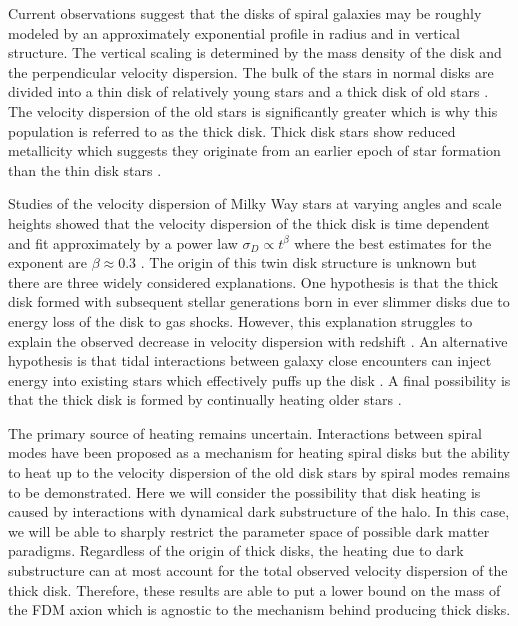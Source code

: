 \documentclass[usenatbib]{mnras}
\begin{document}
\hspace{5mm} Current observations suggest that the disks of spiral galaxies may be roughly modeled by an approximately exponential profile in radius and in vertical structure. The vertical scaling is determined by the mass density of the disk and the perpendicular velocity dispersion.  The bulk of the stars in normal disks are divided into a thin disk of relatively young stars and a thick disk of old stars \citep{binney_tremaine_2008}.  The velocity dispersion of the old stars is significantly greater which is why this population is referred to as the thick disk. Thick disk stars show reduced metallicity which suggests they originate from an earlier epoch of star formation than the thin disk stars \citep{binney_tremaine_2008}. 
\par
Studies of the velocity dispersion of Milky Way stars at varying angles and scale heights showed that the velocity dispersion of the thick disk is time dependent and fit approximately by a power law $\sigma_D \propto t^{\beta}$ where the best estimates for the exponent are $\beta \approx 0.3$ \citep{heating_history}. The origin of this twin disk structure is unknown but there are three widely considered explanations. One hypothesis is that the thick disk formed with subsequent stellar generations born in ever slimmer disks due to energy loss of the disk to gas shocks. However, this explanation struggles to explain the observed decrease in velocity dispersion with redshift \citep{emergence-thick-disk}. An alternative hypothesis is that tidal interactions between galaxy close encounters can inject energy into existing stars which effectively puffs up the disk \citep{thick-disk-mergers}. A final possibility is that the thick disk is formed by continually heating older stars \citep{thin-and-thick-disk}. 
\par 
The primary source of heating remains uncertain. Interactions between spiral modes have been proposed as a mechanism for heating spiral disks but the ability to heat up to the velocity dispersion of the old disk stars by spiral modes remains to be demonstrated. Here we will consider the possibility that disk heating is caused by interactions with dynamical dark substructure of the halo. In this case, we will be able to sharply restrict the parameter space of possible dark matter paradigms. Regardless of the origin of thick disks, the heating due to dark substructure can at most account for the total observed velocity dispersion of the thick disk. Therefore, these results are able to put a lower bound on the mass of the FDM axion which is agnostic to the mechanism behind producing thick disks.
\end{document}
